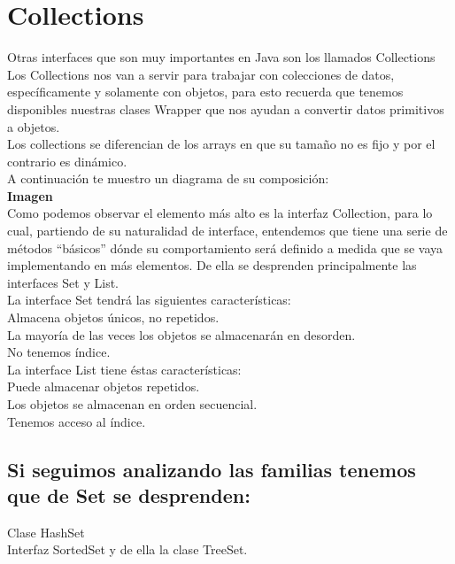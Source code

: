 \documentclass{article}
\begin{document}
\section{Collections}%
Otras interfaces que son muy importantes en Java son los llamados Collections\\

Los Collections nos van a servir para trabajar con colecciones de datos,
específicamente y solamente con objetos, para esto recuerda que tenemos
disponibles nuestras clases Wrapper que nos ayudan a convertir datos primitivos
a objetos.\\

Los collections se diferencian de los arrays en que su tamaño no es fijo y por
el contrario es dinámico.\\

A continuación te muestro un diagrama de su composición:\\

\textbf{Imagen}\\

Como podemos observar el elemento más alto es la interfaz Collection, para lo
cual, partiendo de su naturalidad de interface, entendemos que tiene una serie
de métodos “básicos” dónde su comportamiento será definido a medida que se vaya
implementando en más elementos. De ella se desprenden principalmente las
interfaces Set y List.\\

La interface Set tendrá las siguientes características:\\

Almacena objetos únicos, no repetidos.\\
La mayoría de las veces los objetos se almacenarán en desorden.\\
No tenemos índice.\\

La interface List tiene éstas características:\\

Puede almacenar objetos repetidos.\\
Los objetos se almacenan en orden secuencial.\\
Tenemos acceso al índice.\\

\subsection*{Si seguimos analizando las familias tenemos que de Set se desprenden:}%
Clase HashSet\\
Interfaz SortedSet y de ella la clase TreeSet.\\
\end{document}
